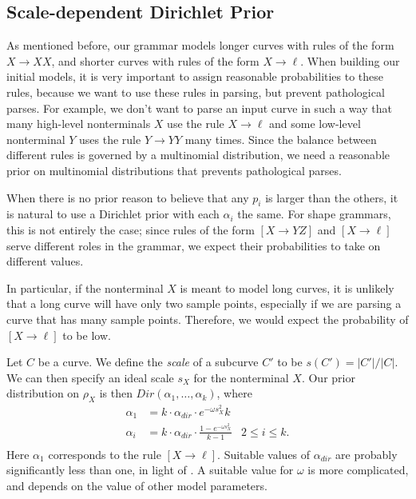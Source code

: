 
\subsection{Scale-dependent Dirichlet Prior}
\label{sec-scale}

As mentioned before, our grammar models longer curves with rules of
the form $X\to XX$, and shorter curves with rules of the form $X\to
\ell$. When building our initial models, it is very important to
assign reasonable probabilities to these rules, because we want to use
these rules in parsing, but prevent pathological parses. For example,
we don't want to parse an input curve in such a way that many
high-level nonterminals $X$ use the rule $X\to \ell$ and some
low-level nonterminal $Y$ uses the rule $Y\to YY$ many times. Since
the balance between different rules is governed by a multinomial
distribution, we need a reasonable prior on multinomial distributions
that prevents pathological parses.

When there is no prior reason to believe that any $p_i$ is larger than
the others, it is natural to use a Dirichlet prior with each
$\alpha_i$ the same. For shape grammars, this is not entirely the
case; since rules of the form $[X\to YZ]$ and $[X\to \ell]$ serve
different roles in the grammar, we expect their probabilities to take
on different values. 

In particular, if the nonterminal $X$ is meant to model long curves,
it is unlikely that a long curve will have only two sample points,
especially if we are parsing a curve that has many sample
points. Therefore, we would expect the probability of $[X\to \ell]$ to
be low.

Let $C$ be a curve. We define the \emph{scale} of a subcurve $C'$ to
be $s(C') = |C'| / |C|$. We can then specify an ideal scale $s_X$ for
the nonterminal $X$. Our prior distribution on $\rho_X$ is then
$Dir(\alpha_1,\dots,\alpha_k)$, where
\begin{align*}
\alpha_1 &= k \cdot \alpha_{dir} \cdot e^{-\omega s_X^2}k &\\
\alpha_i &= k \cdot \alpha_{dir} \cdot \frac{1 - e^{-\omega s_X^2}}{k-1} & 2 \le i \le k.\\
\end{align*}
Here $\alpha_1$ corresponds to the rule $[X\to \ell]$. Suitable values
of $\alpha_{dir}$ are probably significantly less than one, in light
of \cite{johnson-naacl}. A suitable value for $\omega$ is more
complicated, and depends on the value of other model parameters.

